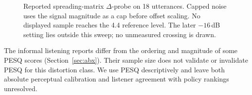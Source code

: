 \documentclass[11pt,a4paper]{article}
\begin{document}
\begin{figure}[htbp]
\centering
{}
\caption{Reported spreading-matrix $\Delta$-probe on 18 utterances. Capped noise uses the signal magnitude as a cap before offset scaling. No displayed sample reaches the 4.4 reference level. The later $-16$\,dB setting lies outside this sweep; no unmeasured crossing is drawn.}
\label{fig:probe}
\end{figure}


The informal listening reports differ from the ordering and magnitude of some PESQ scores (Section~\ref{sec:abx}). Their sample size does not validate or invalidate PESQ for this distortion class. We use PESQ descriptively and leave both absolute perceptual calibration and listener agreement with policy rankings unresolved.
\end{document}
